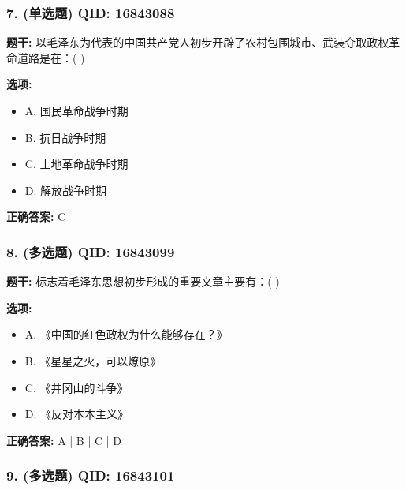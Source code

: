 \documentclass[12pt,UTF8]{ctexart}
\begin{document}
\subsubsection*{7. (单选题) \small QID: 16843088}

\textbf{题干:}
以毛泽东为代表的中国共产党人初步开辟了农村包围城市、武装夺取政权革命道路是在：( )

\textbf{选项:}
\begin{itemize}[leftmargin=*]

  \item A. 国民革命战争时期

  \item B. 抗日战争时期

  \item C. 土地革命战争时期

  \item D. 解放战争时期

\end{itemize}

\textbf{正确答案:}
C

\vspace{0.3em}\hrulefill\vspace{0.7em}

\subsubsection*{8. (多选题) \small QID: 16843099}

\textbf{题干:}
标志着毛泽东思想初步形成的重要文章主要有：( )

\textbf{选项:}
\begin{itemize}[leftmargin=*]

  \item A. 《中国的红色政权为什么能够存在？》

  \item B. 《星星之火，可以燎原》

  \item C. 《井冈山的斗争》

  \item D. 《反对本本主义》

\end{itemize}

\textbf{正确答案:}
A | B | C | D

\vspace{0.3em}\hrulefill\vspace{0.7em}

\subsubsection*{9. (多选题) \small QID: 16843101}
\end{document}
